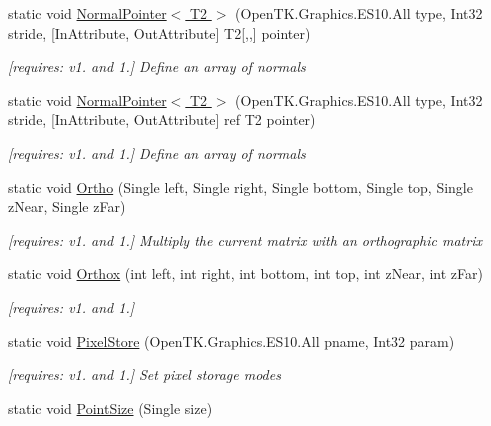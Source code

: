 \begin{DoxyCompactItemize}
static void \hyperlink{class_open_t_k_1_1_graphics_1_1_e_s10_1_1_g_l_a71634158225645ecac1e2bf6acc45842}{Normal\-Pointer$<$ T2 $>$} (Open\-T\-K.\-Graphics.\-E\-S10.\-All type, Int32 stride, \mbox{[}In\-Attribute, Out\-Attribute\mbox{]} T2\mbox{[},,\mbox{]} pointer)
\begin{DoxyCompactList}\small\item\em \mbox{[}requires\-: v1. and 1.\mbox{]} Define an array of normals \end{DoxyCompactList}\item 
static void \hyperlink{class_open_t_k_1_1_graphics_1_1_e_s10_1_1_g_l_a9f5cbd3c0e9e76bed4436855d0d6f449}{Normal\-Pointer$<$ T2 $>$} (Open\-T\-K.\-Graphics.\-E\-S10.\-All type, Int32 stride, \mbox{[}In\-Attribute, Out\-Attribute\mbox{]} ref T2 pointer)
\begin{DoxyCompactList}\small\item\em \mbox{[}requires\-: v1. and 1.\mbox{]} Define an array of normals \end{DoxyCompactList}\item 
static void \hyperlink{class_open_t_k_1_1_graphics_1_1_e_s10_1_1_g_l_a077a9c0bfded17b5d7372eef8bf08cfd}{Ortho} (Single left, Single right, Single bottom, Single top, Single z\-Near, Single z\-Far)
\begin{DoxyCompactList}\small\item\em \mbox{[}requires\-: v1. and 1.\mbox{]} Multiply the current matrix with an orthographic matrix \end{DoxyCompactList}\item 
static void \hyperlink{class_open_t_k_1_1_graphics_1_1_e_s10_1_1_g_l_a4b41a7e6a709b314bd99f08999e16c04}{Orthox} (int left, int right, int bottom, int top, int z\-Near, int z\-Far)
\begin{DoxyCompactList}\small\item\em \mbox{[}requires\-: v1. and 1.\mbox{]}\end{DoxyCompactList}\item 
static void \hyperlink{class_open_t_k_1_1_graphics_1_1_e_s10_1_1_g_l_aa0b8b5718e31fc8b490712ee282a4b61}{Pixel\-Store} (Open\-T\-K.\-Graphics.\-E\-S10.\-All pname, Int32 param)
\begin{DoxyCompactList}\small\item\em \mbox{[}requires\-: v1. and 1.\mbox{]} Set pixel storage modes \end{DoxyCompactList}\item 
static void \hyperlink{class_open_t_k_1_1_graphics_1_1_e_s10_1_1_g_l_a49a21287b5ce9bbaff6f8d28aa927d6a}{Point\-Size} (Single size)

\end{DoxyCompactItemize}
